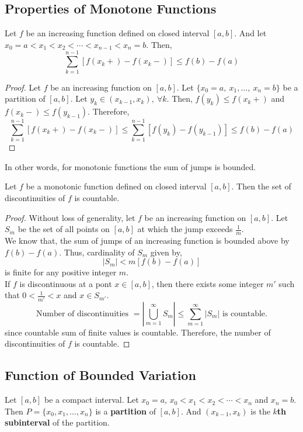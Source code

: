 \subsection{Properties of Monotone Functions}
\begin{theorem}
	Let $f$ be an increasing function defined on closed interval $[a,b]$.
	And let $x_0=a < x_1 < x_2 < \dotsb <x_{n-1} < x_n = b$.
	Then,
	\[ \sum_{k = 1}^{n-1} [f(x_k+)-f(x_k-)] \le f(b) - f(a) \]
\end{theorem}
\begin{proof}
	Let $f$ be an increasing function on $[a,b]$.
	Let $\{x_0=a,\ x_1, \dots,\ x_n=b\}$ be a partition of $[a,b]$.
	Let $y_k \in (x_{k-1},x_k),\ \forall k$.
	Then, $f(y_k) \le f(x_k+)$ and $f(x_k-) \le f(y_{k-1})$.
	Therefore,
	\[ \sum_{k=1}^{n-1} [f(x_k+) - f(x_k-)] \le \sum_{k=1}^{n-1} [f(y_k) - f(y_{k-1})] \le f(b) - f(a) \]
\end{proof}
\begin{commentary}
	In other words, for monotonic functions the sum of jumps is bounded.
\end{commentary}

\begin{theorem}
	Let $f$ be a monotonic function defined on closed interval $[a,b]$.
	Then the set of discontinuities of $f$ is countable.
\end{theorem}
\begin{proof}
	Without loss of generality, let $f$ be an increasing function on $[a,b]$.
	Let $S_m$ be the set of all points on $[a,b]$ at which the jump exceeds $\frac{1}{m}$.\\

	We know that, the sum of jumps of an increasing function is bounded above by $f(b)-f(a)$.	
	Thus, cardinality of $S_m$ given by,
	\[ |S_m| < m[f(b)-f(a)] \]
	is finite for any positive integer $m$.\\

	If $f$ is discontinuous at a pont $x \in [a,b]$, then there exists some integer $m'$ such that $0 < \frac{1}{m'} < x $ and $x \in S_{m'}$.
	\[ \text{Number of discontinuities } = \left| \bigcup_{m=1}^\infty S_m \right| \le \sum_{m=1}^\infty |S_m| \text{ is countable.}\]
	since countable sum of finite values is countable.
	Therefore, the number of discontinuities of $f$ is countable.
\end{proof}

\subsection{Function of Bounded Variation}
\begin{definition}[partition]
	Let $[a,b]$ be a compact interval.
	Let $x_0 = a$, $x_0 < x_1 < x_2 < \dotsb < x_n$ and $x_n = b$.
	Then $P = \{ x_0,x_1,\dots,x_n \}$ is a \textbf{partition} of $[a,b]$.
	And $(x_{k-1},x_k)$ is the \textbf{$k$th subinterval} of the partition.
\end{definition}

